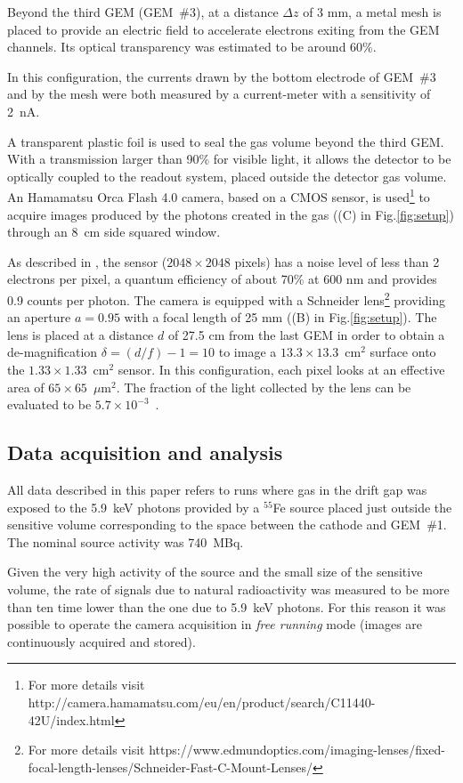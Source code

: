 \documentclass[a4paper,11pt]{article}
\begin{document}
Beyond the third GEM (GEM~\#3), at a distance $\Delta z$ of 3 mm, a metal mesh is placed to provide an electric field to accelerate electrons exiting from the GEM channels. Its optical transparency was estimated to be around 60\%.

In this configuration, the currents drawn by the bottom electrode of GEM~\#3 and by the mesh were both measured by a current-meter with a sensitivity of 2~nA.

A transparent plastic foil
is used to seal the gas volume beyond the third GEM.
With a transmission larger than 90\% for visible light, 
it allows the detector to be optically coupled to the readout system, 
placed outside the detector gas volume.
An Hamamatsu Orca Flash 4.0 camera, based on a CMOS sensor, 
is used\footnote{For more details visit http://camera.hamamatsu.com/eu/en/product/search/C11440-42U/index.html}
to acquire images produced by the photons created in the gas ((C) in Fig.\ref{fig:setup})
through an 8~cm side squared window. 

As described in \cite{bib:jinst_orange1},
the sensor ($2048 \times 2048$ pixels) 
has a noise level of less than 2 electrons per pixel,
a quantum efficiency of about 70\% at 600 nm
and provides 0.9 counts per photon.
The camera is equipped with a Schneider 
lens\footnote{For more details visit https://www.edmundoptics.com/imaging-lenses/fixed-focal-length-lenses/Schneider-Fast-C-Mount-Lenses/} 
providing an aperture $a = 0.95$ with a focal length of 25 mm ((B) in Fig.\ref{fig:setup}).
The lens is placed at a distance $d$ of 27.5 cm from the last GEM
in order to obtain a de-magnification 
$\delta = (d/f) - 1 = 10$ to 
image a $13.3 \times 13.3$~cm$^2$ surface onto the 
$1.33 \times 1.33$~cm$^2$ sensor. 
In this configuration, each pixel
looks at an effective area of 
$65 \times 65$~$\mu$m$^2$.
The fraction of the light collected by the lens can be evaluated to be $5.7 \times 10^{-3}$~\cite{bib:ieee_orange}.

\subsection{Data acquisition and analysis}

All data described in this paper refers to runs where gas in the drift gap was exposed to the 5.9~keV photons provided by a $^{55}$Fe source placed just outside the sensitive volume corresponding to the space between the cathode and GEM~\#1.
The nominal source activity was 740~MBq.

Given the very high activity of the source and the small size of the sensitive volume, the rate of signals due to natural radioactivity was measured to be more than ten time lower than the one due to 5.9~keV photons. For this reason it was possible to operate the camera acquisition in {\it free running} mode (images are continuously acquired and stored).
\end{document}

